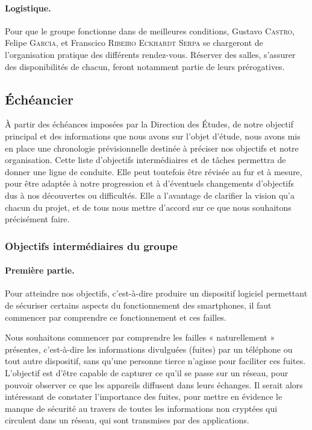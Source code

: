 \documentclass[a4paper, 12pt,twoside]{article}
\begin{document}
		\paragraph{Logistique. } Pour que le groupe fonctionne dans de meilleures conditions, \textcolor{bleu303}{Gustavo \textsc{Castro}}, \textcolor{bleu303}{Felipe \textsc{Garcia}}, et \textcolor{bleu303}{Franscico \textsc{Ribeiro Eckhardt Serpa}} se chargeront de l'organisation pratique des différents rendez-vous. Réserver des salles, s'assurer des disponibilités de chacun, feront notamment partie de leurs prérogatives.
	
	\subsection{Échéancier}
	
	À partir des échéances imposées par la Direction des Études, de notre objectif principal et des informations que nous avons sur l'objet d'étude, nous avons mis en place une chronologie prévisionnelle destinée à préciser nos objectifs et notre organisation. Cette liste d'objectifs intermédiaires et de tâches permettra de donner une ligne de conduite. Elle peut toutefois être révisée au fur et à mesure, pour être adaptée à notre progression et à d'éventuels changements d'objectifs dus à nos découvertes ou difficultés. Elle a l'avantage de clarifier la vision qu'a chacun du projet, et de tous nous mettre d'accord sur ce que nous souhaitons précisément faire.
	
		\subsubsection{Objectifs intermédiaires du groupe}
		
		\paragraph{Première partie. } Pour atteindre nos objectifs, c'est-à-dire produire un dispositif logiciel permettant de sécuriser certains aspects du fonctionnement des smartphones, il faut commencer par comprendre ce fonctionnement et ces failles.
		
		Nous souhaitons commencer par comprendre les failles «  naturellement  » présentes, c'est-à-dire les informations divulguées (fuites) par un téléphone ou tout autre dispositif, sans qu'une personne tierce n'agisse pour faciliter ces fuites. L'objectif est d'être capable de capturer ce qu'il se passe sur un réseau, pour pouvoir observer ce que les appareils diffusent dans leurs échanges. Il serait alors intéressant de constater l'importance des fuites, pour mettre en évidence le manque de sécurité au travers de toutes les informations non cryptées qui circulent dans un réseau, qui sont transmises par des applications.
		
\end{document}
